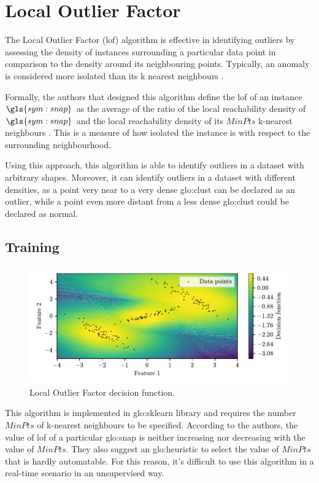 \section{Local Outlier Factor}
\label{sec:LocalOutlierFactor}


The Local Outlier Factor (\gls{lof}) algorithm is effective in identifying outliers by assessing the density of instances surrounding a particular data point in comparison to the density around its neighbouring points. Typically, an anomaly is considered more isolated than its k nearest neighbours . 

Formally, the authors that designed this algorithm define the \gls{lof} of an instance $\gls{sym:snap}$ as the average of the ratio of the local reachability density of $\gls{sym:snap}$ and the local reachability density of its $MinPts$ k-nearest neighbours \cite{breunig2000lof}. This is a measure of how isolated the instance is with respect to the surrounding neighbourhood. 

Using this approach, this algorithm is able to identify outliers in a dataset with arbitrary shapes. Moreover, it can identify outliers in a dataset with different densities, as a point very near to a very dense \gls{glo:clust} can be declared as an outlier, while a point even more distant from a less dense \gls{glo:clust} could be declared as normal.

\subsection{Training}
\label{sec:lof_train}
\begin{figure}
    \centering
    \includegraphics{images/LOF/Figure_1.pdf}
    \caption{Local Outlier Factor decision function.}
    \label{fig:LocalOutlierFactor}
\end{figure}
This algorithm is implemented in \gls{glo:sklearn} library and requires the number $MinPts$ of k-nearest neighbours to be specified. According to the authors, the value of \gls{lof} of a particular \gls{glo:snap} is neither increasing nor decreasing with the value of $MinPts$. They also suggest an \gls{glo:heuristic} to select the value of $MinPts$ that is hardly automatable. 
For this reason, it's difficult to use this algorithm in a real-time scenario in an unsupervised way.

